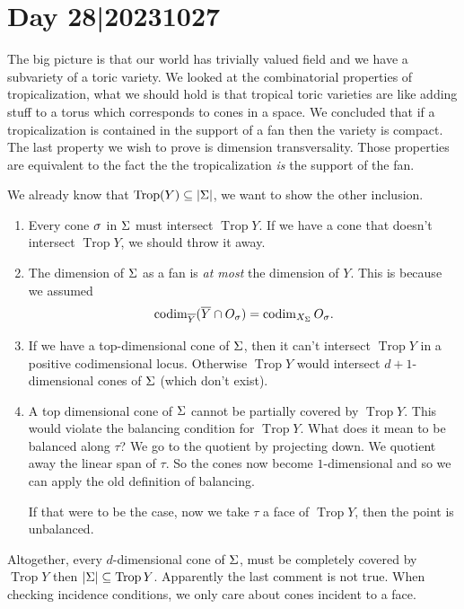 \documentclass[12pt]{memoir}
\DeclareMathOperator{\Trop}{Trop}
\begin{document}
\section{Day 28|20231027}

The big picture is that our world has trivially valued field and we have a subvariety of a toric variety. We looked at the combinatorial properties of tropicalization, what we should hold is that tropical toric varieties are like adding stuff to a torus which corresponds to cones in a space. We concluded that if a tropicalization is contained in the support of a fan then the variety is compact. The last property we wish to prove is dimension transversality. Those properties are equivalent to the fact the the tropicalization \emph{is} the support of the fan.

\begin{ptcbp}
We already know that $\Trop(Y)\subseteq |\Sg|$, we want to show the other inclusion. 
\begin{enumerate}
    \item Every cone $\sigma$ in $\Sigma$ must intersect $\Trop Y$. If we have a cone that doesn't intersect $\Trop Y$, we should throw it away.
    \item The dimension of $\Sigma$ as a fan is \emph{at most} the dimension of $Y$. This is because we assumed 
    $$\operatorname{codim}_{\overline Y}(\overline Y\cap O_\sigma)=\operatorname{codim}_{X_\Sigma} O_\sigma.$$
    \item If we have a top-dimensional cone of $\Sigma$, then it can't intersect $\Trop Y$ in a positive codimensional locus. Otherwise $\Trop Y$ would intersect $d+1$-dimensional cones of $\Sigma$ (which don't exist).
    \item A top dimensional cone of $\Sigma$ cannot be partially covered by $\Trop Y$. This would violate the balancing condition for $\Trop Y$. What does it mean to be balanced along $\tau$? We go to the quotient by projecting down. We quotient away the linear span of $\tau$. So the cones now become $1$-dimensional and so we can apply the old definition of balancing.\par 
    If that were to be the case, now we take $\tau$ a face of $\Trop Y$, then the point is unbalanced. 
\end{enumerate}
Altogether, every $d$-dimensional cone of $\Sigma$, must be completely covered by $\Trop Y$ then $|\Sg|\subseteq\Trop Y$.  Apparently the last comment is not true. When checking incidence conditions, we only care about cones incident to a face.\par 

\end{ptcbp}
\end{document}
